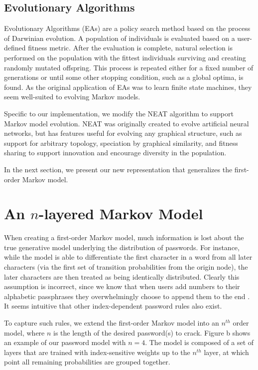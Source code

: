 \documentclass{acm_proc_article-sp}
\begin{document}
\subsection{Evolutionary Algorithms}

Evolutionary Algorithms (EAs) \cite{fogel-66} are a policy search method based on the process of Darwinian evolution. A population of individuals is evaluated based on a user-defined fitness metric. After the evaluation is complete, natural selection is performed on the population with the fittest individuals surviving and creating randomly mutated offspring. This process is repeated either for a fixed number of generations or until some other stopping condition, such as a global optima, is found. As the original application of EAs was to learn finite state machines, they seem well-suited to evolving Markov models.

Specific to our implementation, we modify the NEAT algorithm \cite{stanley-ec02} to support Markov model evolution. NEAT was originally created to evolve artificial neural networks, but has features useful for evolving any graphical structure, such as support for arbitrary topology, speciation by graphical similarity, and fitness sharing to support innovation and encourage diversity in the population.

In the next section, we present our new representation that generalizes the first-order Markov model.

\section{An $n$-layered Markov Model}
\label{sec:model}

When creating a first-order Markov model, much information is lost about the true generative model underlying the distribution of passwords. For instance, while the model is able to differentiate the first character in a word from all later characters (via the first set of transition probabilities from the origin node), the later characters are then treated as being identically distributed. Clearly this assumption is incorrect, since we know that when users add numbers to their alphabetic passphrases they overwhelmingly choose to append them to the end \cite{weir-ccs10}. It seems intuitive that other index-dependent password rules also exist.

To capture such rules, we extend the first-order Markov model into an $n^{th}$ order model, where $n$ is the length of the desired password(s) to crack. Figure \cite{fig:markovchains}b shows an example of our password model with $n = 4$. The model is composed of a set of layers that are trained with index-sensitive weights up to the $n^{th}$ layer, at which point all remaining probabilities are grouped together.
\end{document}
